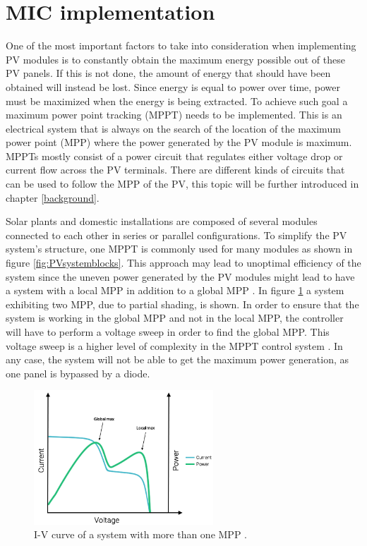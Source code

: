 
\section{MIC implementation}
One of the most important factors to take into consideration when implementing PV modules is to constantly obtain the maximum energy possible out of these PV panels. If this is not done, the amount of energy that should have been obtained will instead be lost. Since energy is equal to power over time, power must be maximized when the energy is being extracted. To achieve such goal a maximum power point tracking (MPPT) needs to be implemented. This is an electrical system that is always on the search of the location of the maximum power point (MPP) where the power generated by the PV module is maximum. MPPTs mostly consist of a power circuit that regulates either voltage drop or current flow across the PV terminals. There are different kinds of circuits that can be used to follow the MPP of the PV, this topic will be further introduced in chapter \ref{background}.

Solar plants and domestic installations are composed of several modules connected to each other in series or parallel configurations. To simplify the PV system's structure, one MPPT is commonly used for many modules as shown in figure \ref{fig:PVsystemblocks}. This approach may lead to unoptimal efficiency of the system since the uneven power generated by the PV modules might lead to have a system with a local MPP in addition to a global MPP \cite{AN1521_MC}. In figure \ref{multiple_local_MPP} a system exhibiting two MPP, due to partial shading, is shown. In order to ensure that the system is working in the global MPP and not in the local MPP, the controller will have to perform a voltage sweep in order to find the global MPP. This voltage sweep is a higher level of complexity in the MPPT control system \cite{AN1521_MC}. In any case, the system will not be able to get the maximum power generation, as one panel is bypassed by a diode.

\begin{figure}[htbp]
	\begin{center}
		\includegraphics[width=0.6\textwidth]{../Pictures/local_MPP}
		\caption{I-V curve of a system with more than one MPP \cite{local_mpp}.}
		\label{multiple_local_MPP}
	\end{center}	
\end{figure}

